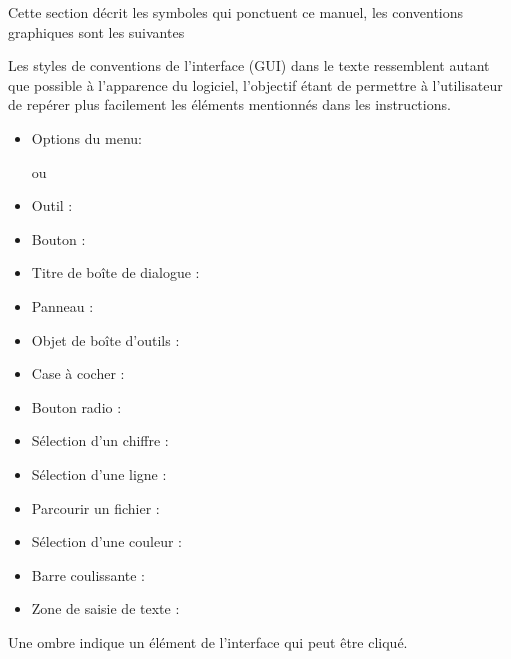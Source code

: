 \label{label_conventions}

Cette section décrit les symboles qui ponctuent ce manuel, les conventions graphiques sont les suivantes


Les styles de conventions de l'interface (GUI) dans le texte ressemblent autant que possible à l'apparence du logiciel, l'objectif étant de permettre à l'utilisateur de repérer plus facilement les éléments mentionnés dans les instructions.

\begin{itemize}[label=--,itemsep=5pt]
\item Options du menu:  \fleche %

ou

 \fleche %
 \fleche {}
\item Outil : 
\item Bouton : 
\item Titre de boîte de dialogue : 
\item Panneau : 

% 
% 
% 
% 
% 
\item Objet de boîte d'outils :  
\item Case à cocher : 
\item Bouton radio :   
\item Sélection d'un chiffre : 
\item Sélection d'une ligne : 
\item Parcourir un fichier : \browsebutton 
\item Sélection d'une couleur : 
\item Barre coulissante : 
\item Zone de saisie de texte : 
\end{itemize}
Une ombre indique un élément de l'interface qui peut être cliqué.

